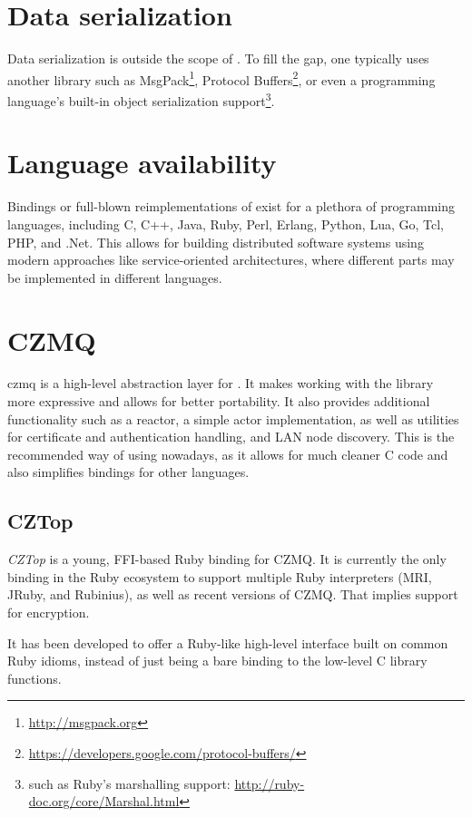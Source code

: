 
\section{Data serialization}
Data serialization is outside the scope of \zmq. To fill the gap, one typically
uses another library such as MsgPack\footnote{\url{http://msgpack.org}},
Protocol
Buffers\footnote{\url{https://developers.google.com/protocol-buffers/}}, or
even a programming language's built-in object serialization
support\footnote{such as Ruby's marshalling support:
\url{http://ruby-doc.org/core/Marshal.html}}.

\section{Language availability}
Bindings or full-blown reimplementations of \zmq exist for a plethora of
programming languages, including C, C++, Java, Ruby, Perl, Erlang, Python, Lua,
Go, Tcl, PHP, and .Net. This allows for building distributed software systems
using modern approaches like service-oriented architectures, where different
parts may be implemented in different languages.

\section{CZMQ}\label{sec:zmq:czmq}
\gls{czmq} is a high-level abstraction layer for \zmq. It makes working with the \zmq
library more expressive and allows for better portability. It also provides
additional functionality such as a reactor, a simple actor implementation, as
well as utilities for certificate and authentication handling, and LAN node
discovery. This is the recommended way of using \zmq nowadays, as it allows for
much cleaner C code and also simplifies bindings for other languages.

\subsection{CZTop}
\emph{CZTop} is a young, \gls{FFI}-based Ruby binding for CZMQ. It is currently
the only binding in the Ruby ecosystem to support multiple Ruby interpreters
(\gls{MRI}, \gls{JRuby}, and \gls{Rubinius}), as well as recent versions of
CZMQ. That implies support for encryption.

It has been developed to offer a Ruby-like high-level interface built on common
Ruby idioms, instead of just being a bare binding to the low-level C library
functions.

